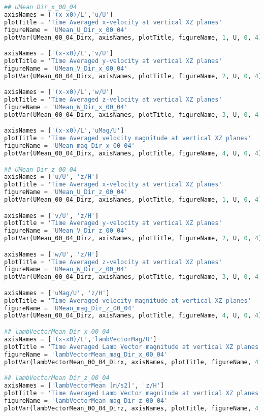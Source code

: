 \documentclass[../main.tex]{subfiles}
\begin{document}
\begin{lstlisting}[language=python]
## UMean Dir_x_00_04
axisNames = ['(x-x0)/L','u/U']
plotTitle = 'Time Averaged x-velocity at vertical XZ planes'
figureName = 'UMean_U_Dir_x_00_04'
plotVar(UMean_00_04_Dirx, axisNames, plotTitle, figureName, 1, U, 0, 4)

axisNames = ['(x-x0)/L','v/U']
plotTitle = 'Time Averaged y-velocity at vertical XZ planes'
figureName = 'UMean_V_Dir_x_00_04'
plotVar(UMean_00_04_Dirx, axisNames, plotTitle, figureName, 2, U, 0, 4)

axisNames = ['(x-x0)/L','w/U']
plotTitle = 'Time Averaged z-velocity at vertical XZ planes'
figureName = 'UMean_W_Dir_x_00_04'
plotVar(UMean_00_04_Dirx, axisNames, plotTitle, figureName, 3, U, 0, 4)

axisNames = ['(x-x0)/L','uMag/U']
plotTitle = 'Time Averaged velocity magnitude at vertical XZ planes'
figureName = 'UMean_mag_Dir_x_00_04'
plotVar(UMean_00_04_Dirx, axisNames, plotTitle, figureName, 4, U, 0, 4)

## UMean Dir_z_00_04
axisNames = ['u/U', 'z/H']
plotTitle = 'Time Averaged x-velocity at vertical XZ planes'
figureName = 'UMean_U_Dir_z_00_04'
plotVar(UMean_00_04_Dirz, axisNames, plotTitle, figureName, 1, U, 0, 4)

axisNames = ['v/U', 'z/H']
plotTitle = 'Time Averaged y-velocity at vertical XZ planes'
figureName = 'UMean_V_Dir_z_00_04'
plotVar(UMean_00_04_Dirz, axisNames, plotTitle, figureName, 2, U, 0, 4)

axisNames = ['w/U', 'z/H']
plotTitle = 'Time Averaged z-velocity at vertical XZ planes'
figureName = 'UMean_W_Dir_z_00_04'
plotVar(UMean_00_04_Dirz, axisNames, plotTitle, figureName, 3, U, 0, 4)

axisNames = ['uMag/U', 'z/H']
plotTitle = 'Time Averaged velocity magnitude at vertical XZ planes'
figureName = 'UMean_mag_Dir_z_00_04'
plotVar(UMean_00_04_Dirz, axisNames, plotTitle, figureName, 4, U, 0, 4)

## lambVectorMean Dir_x_00_04
axisNames = ['(x-x0)/L','lambVectorMag/U']
plotTitle = 'Time Averaged Lamb Vector magnitude at vertical XZ planes'
figureName = 'lambVectorMean_mag_Dir_x_00_04'
plotVar(lambVectorMean_00_04_Dirx, axisNames, plotTitle, figureName, 4, 1, 0, 4)

## lambVectorMean Dir_z_00_04
axisNames = ['lambVectorMean [m/s2]', 'z/H']
plotTitle = 'Time Averaged Lamb Vector magnitude at vertical XZ planes'
figureName = 'lambVectorMean_mag_Dir_z_00_04'
plotVar(lambVectorMean_00_04_Dirz, axisNames, plotTitle, figureName, 4, 1, 0, 4)


\end{lstlisting}
\end{document}
